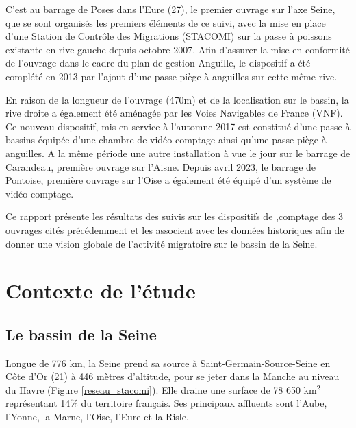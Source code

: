 \documentclass[11pt,titlepage,twoside]{article}\usepackage[]{graphicx}\usepackage[table]{xcolor}
\begin{document}
C'est au barrage de Poses dans l'Eure (27), le premier ouvrage sur l'axe Seine, que se sont organisés les premiers éléments de ce suivi, avec la mise en place d'une Station de Contrôle des Migrations (STACOMI) sur la passe à poissons existante en rive gauche depuis octobre 2007. Afin d'assurer la mise en conformité de l'ouvrage dans le cadre du plan de gestion Anguille, le dispositif a été complété en 2013 par l'ajout d'une passe piège à anguilles sur cette même rive.

En raison de la longueur de l'ouvrage (470m) et de la localisation sur le bassin, la rive droite a également été aménagée par les Voies Navigables de France (VNF). Ce nouveau dispositif, mis en service à l'automne 2017 est constitué d'une passe à bassins équipée d'une chambre de vidéo-comptage ainsi qu'une passe piège à anguilles. A la même période une autre installation à vue le jour sur le barrage de Carandeau, première ouvrage sur l'Aisne. Depuis avril 2023, le barrage de Pontoise, première ouvrage sur l'Oise a également été équipé d'un système de vidéo-comptage.

Ce rapport présente les résultats des suivis sur les dispositifs de ,comptage des 3 ouvrages cités précédemment et les associent avec les données historiques afin de donner une vision globale de l'activité migratoire sur le bassin de la Seine.

\clearpage

\section{Contexte de l'étude}

\subsection{Le bassin de la Seine}

Longue de 776 km, la Seine prend sa source à Saint-Germain-Source-Seine en Côte d'Or (21) à 446 mètres d'altitude, pour se jeter dans la Manche au niveau du Havre (Figure \ref{reseau_stacomi}). Elle draine une surface de 78 650 km$^2$ représentant 14\% du territoire français. Ses principaux affluents sont l'Aube, l'Yonne, la Marne, l'Oise, l'Eure et la Risle.
\end{document}
